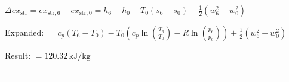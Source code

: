 \( \Delta ex_{\text{str}} = ex_{\text{str},6} - ex_{\text{str},0} = h_6 - h_0 - T_0 \left( s_6 - s_0 \right) + \frac{1}{2} \left( w_6^2 - w_0^2 \right) \)  

Expanded:  
\( = c_p \left( T_6 - T_0 \right) - T_0 \left( c_p \ln \left( \frac{T_6}{T_0} \right) - R \ln \left( \frac{p_6}{p_0} \right) \right) + \frac{1}{2} \left( w_6^2 - w_0^2 \right) \)  

Result:  
\( = 120.32 \, \text{kJ/kg} \)  

---